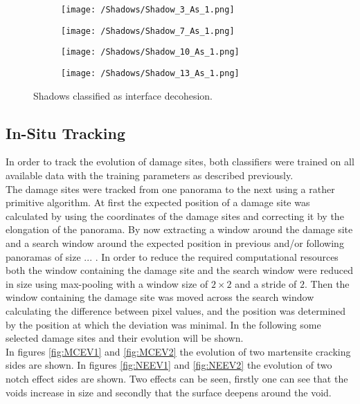 \begin{figure}[H]
\centering
\begin{subfigure}{0.24\textwidth}
\texttt{[image: /Shadows/Shadow\_3\_As\_1.png]}
\caption{}
\end{subfigure}
\centering
\begin{subfigure}{0.24\textwidth}
\texttt{[image: /Shadows/Shadow\_7\_As\_1.png]}
\caption{}
\end{subfigure}
\centering
\begin{subfigure}{0.24\textwidth}
\texttt{[image: /Shadows/Shadow\_10\_As\_1.png]}
\caption{}
\end{subfigure}
\centering
\begin{subfigure}{0.24\textwidth}
\texttt{[image: /Shadows/Shadow\_13\_As\_1.png]}
\caption{}
\end{subfigure}
\caption{Shadows classified as interface decohesion.}
\label{fig:shadowAsID}
\end{figure}


\subsection{In-Situ Tracking}
In order to track the evolution of damage sites, both classifiers were trained on all available data with the training parameters as described previously. \\

The damage sites were tracked from one panorama to the next using a rather primitive algorithm. At first the expected position of a damage site was calculated by using the coordinates of the damage sites and correcting it by the elongation of the panorama. By now extracting a window around the damage site and a search window around the expected position in previous and/or following panoramas of size ... . In order to reduce the required computational resources both the window containing the damage site and the search window were reduced in size using max-pooling with a window size of $2\times 2$ and a stride of $2$. Then the window containing the damage site was moved across the search window calculating the difference between pixel values, and the position was determined by the position at which the deviation was minimal. In the following some selected damage sites and their evolution will be shown. \\

In figures \ref{fig:MCEV1} and \ref{fig:MCEV2} the evolution of two martensite cracking sides are shown. In figures \ref{fig:NEEV1} and \ref{fig:NEEV2} the evolution of two notch effect sides are shown. Two effects can be seen, firstly one can see that the voids increase in size and secondly that the surface deepens around the void. \\


